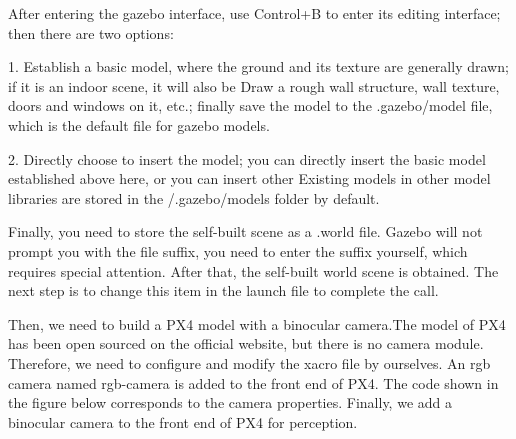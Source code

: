 \documentclass[conference]{IEEEtran}
\begin{document}
After entering the gazebo interface, use Control+B to enter its editing interface; then there are two options:

1. Establish a basic model, where the ground and its texture are generally drawn; if it is an indoor scene, it will also be
Draw a rough wall structure, wall texture, doors and windows on it, etc.; finally save the model to the .gazebo/model file, which is the default file for gazebo models.

2. Directly choose to insert the model; you can directly insert the basic model established above here, or you can insert other
Existing models in other model libraries are stored in the /.gazebo/models folder by default.

Finally, you need to store the self-built scene as a .world file. Gazebo will not prompt you with the file suffix, you need to enter the suffix yourself, which requires special attention. After that, the self-built world scene is obtained. The next step is to change this item in the launch file to complete the call.

Then, we need to build a PX4 model with a binocular camera.The model of PX4 has been open sourced on the official website, but there is no camera module. Therefore, we need to configure and modify the xacro file by ourselves. An rgb camera named rgb-camera is added to the front end of PX4. The code shown in the figure below corresponds to the camera properties. Finally, we add a binocular camera to the front end of PX4 for perception.
\end{document}
